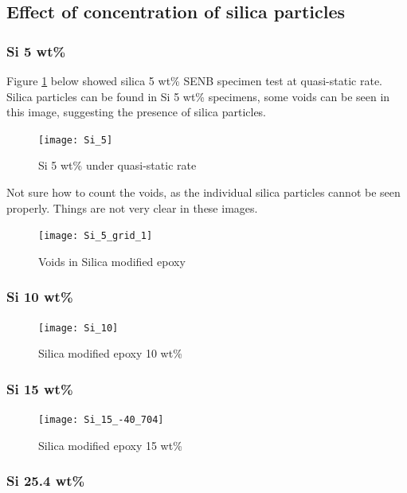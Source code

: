 \documentclass[numbers=noendperiod,chapterprefix=on]{icldt} %
\begin{document}
{\subsection{Effect of concentration of silica particles}

\subsubsection{Si 5 wt\%}
 
Figure \ref{Si_5} below showed silica 5 wt\% SENB specimen test at quasi-static rate.
Silica particles can be found in Si 5 wt\% specimens, some voids can be seen in this image, suggesting the presence of silica particles.

\begin{figure}[!hp]
\centering
\texttt{[image: Si\_5]}
\caption{Si 5 wt\% under quasi-static rate} \label{Si_5}
\end{figure}
\FloatBarrier

Not sure how to count the voids, as the individual silica particles cannot be seen properly. Things are not very clear in these images.
\begin{figure}[!hp]
\centering
\texttt{[image: Si\_5\_grid\_1]}
\caption{Voids in Silica modified epoxy} \label{Si_5_grid_1}
\end{figure}
\FloatBarrier

\subsubsection{Si 10 wt\%}

\begin{figure}[!hp]
\centering
\texttt{[image: Si\_10]}
\caption{Silica modified epoxy 10 wt\%} \label{Si_10}
\end{figure}
\FloatBarrier

\subsubsection{Si 15 wt\%}

\begin{figure}[!hp]
\centering
\texttt{[image: Si\_15\_-40\_704]}
\caption{Silica modified epoxy 15 wt\% 
} \label{Si_15_-40_704}
\end{figure}
\FloatBarrier

\subsubsection{Si 25.4 wt\%}

}
\end{document}
